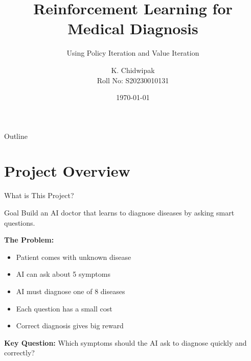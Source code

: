 \documentclass[aspectratio=169]{beamer}
\title[RL Medical Diagnosis]{Reinforcement Learning for Medical Diagnosis}
\subtitle{Using Policy Iteration and Value Iteration}
\author[K. Chidwipak]{K. Chidwipak\\[0.3cm]\small Roll No: S20230010131}
\institute[RL Course]{Reinforcement Learning Course}
\date{\today}
\begin{document}
\begin{frame}
    \titlepage
\end{frame}

\begin{frame}{Outline}
    \tableofcontents
\end{frame}

\section{Project Overview}

\begin{frame}{What is This Project?}
    \begin{block}{Goal}
        Build an AI doctor that learns to diagnose diseases by asking smart questions.
    \end{block}
    
    \vspace{0.5cm}
    
    \textbf{The Problem:}
    \begin{itemize}
        \item Patient comes with unknown disease
        \item AI can ask about 5 symptoms
        \item AI must diagnose one of 8 diseases
        \item Each question has a small cost
        \item Correct diagnosis gives big reward
    \end{itemize}
    
    \vspace{0.3cm}
    
    \textbf{Key Question:} Which symptoms should the AI ask to diagnose quickly and correctly?
\end{frame}
\end{document}
